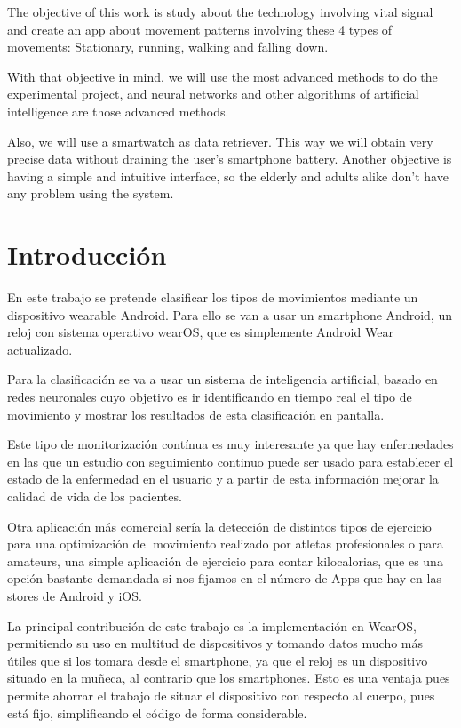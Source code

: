 \documentclass[12pt]{article}
\numberwithin{equation}{section}
\begin{document}
The objective of this work is study about the technology involving vital signal and create an app about movement patterns involving these 4 types of movements: Stationary, running, walking and falling down.

With that objective in mind, we will use the most advanced methods to do the experimental project, and neural networks and other algorithms of artificial intelligence are those advanced methods.

Also, we will use a smartwatch as data retriever. This way we will obtain very precise data without draining the user's smartphone battery. Another objective is having a simple and intuitive interface, so the elderly and adults alike don't have any problem using the system.

\newpage
\section{Introducción}

En este trabajo se pretende clasificar los tipos de movimientos mediante un dispositivo wearable Android. Para ello se van a usar un smartphone Android, un reloj con sistema operativo wearOS, que es simplemente Android Wear actualizado.

Para la clasificación se va a usar un sistema de inteligencia artificial, basado en redes neuronales cuyo objetivo es ir identificando en tiempo real el tipo de movimiento y mostrar los resultados de esta clasificación en pantalla.

Este tipo de monitorización contínua es muy interesante ya que hay enfermedades en las que un estudio con seguimiento continuo puede ser usado para establecer el estado de la enfermedad en el usuario y a partir de esta información mejorar la calidad de vida de los pacientes.

Otra aplicación más comercial sería la detección de distintos tipos de ejercicio para una optimización del movimiento realizado por atletas profesionales o para amateurs, una simple aplicación de ejercicio para contar kilocalorias, que es una opción bastante demandada si nos fijamos en el número de Apps que hay en las stores de Android y iOS.

La principal contribución de este trabajo es la implementación en WearOS, permitiendo su uso en multitud de dispositivos y tomando datos mucho más útiles que si los tomara desde el smartphone, ya que el reloj es un dispositivo situado en la muñeca, al contrario que los smartphones. Esto es una ventaja pues permite ahorrar el trabajo de situar el dispositivo con respecto al cuerpo, pues está fijo, simplificando el código de forma considerable.
\end{document}

